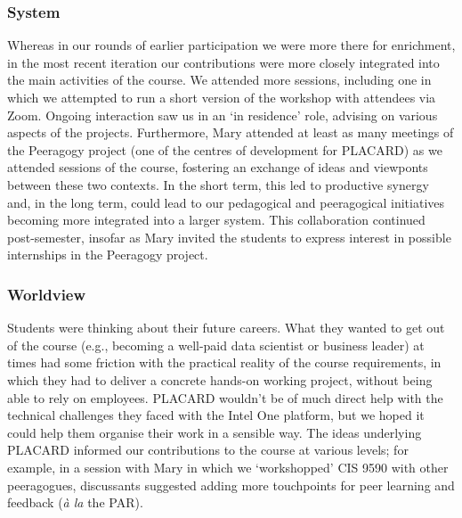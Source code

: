 \documentclass[acmlarge,timestamp]{acmart}
\begin{document}
\subsubsection{System}
Whereas in our rounds of earlier participation we were more there for
enrichment, in the most recent iteration our contributions were more
closely integrated into the main activities of the course.  We
attended more sessions, including one in which we attempted to run a
short version of the workshop with attendees via Zoom.  Ongoing
interaction saw us in an ‘in residence’ role, advising on various
aspects of the projects.  Furthermore, Mary attended at least as many
meetings of the Peeragogy project (one of the centres of development
for PLACARD) as we attended sessions of the course, fostering an
exchange of ideas and viewponts between these two contexts. In the
short term, this led to productive synergy and, in the long term,
could lead to our pedagogical and peeragogical initiatives becoming
more integrated into a larger system. This collaboration continued
post-semester, insofar as Mary invited the students to express
interest in possible internships in the Peeragogy project.

\subsubsection{Worldview}
Students were thinking about their future careers.  What they wanted
to get out of the course (e.g., becoming a well-paid data scientist or
business leader) at times had some friction with the practical reality
of the course requirements, in which they had to deliver a concrete
hands-on working project, without being able to rely on employees.
PLACARD wouldn’t be of much direct help with the technical challenges
they faced with the Intel One platform, but we hoped it could help
them organise their work in a sensible way.  The ideas underlying
PLACARD informed our contributions to the course at various levels;
for example, in a session with Mary in which we ‘workshopped’ CIS 9590
with other peeragogues, discussants suggested adding more touchpoints
for peer learning and feedback (\emph{\`a la} the PAR).
\end{document}
